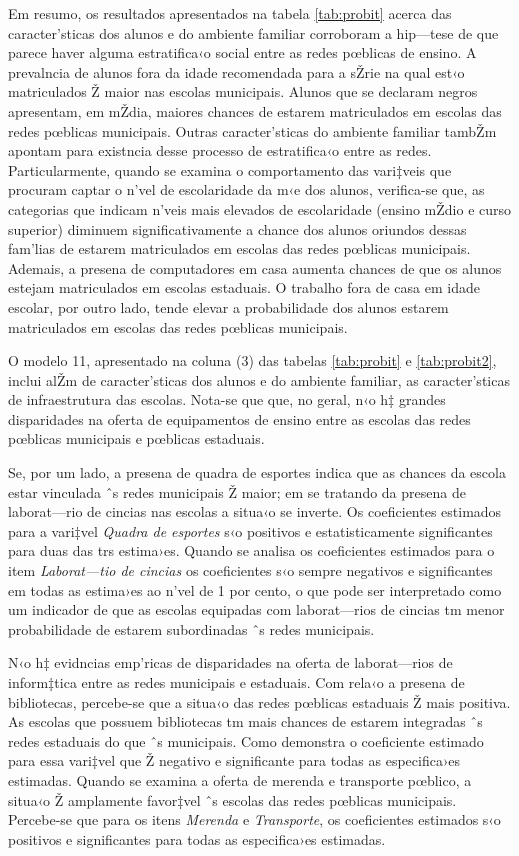 \documentclass[a4paper, 12pt]{article}
\begin{document}
Em resumo, os resultados apresentados na tabela \ref{tab:probit} acerca das caracter’sticas dos alunos e do ambiente familiar corroboram a hip—tese de que parece haver alguma estratifica‹o social entre as redes pœblicas de ensino. A prevalncia de alunos fora da idade recomendada para a sŽrie na qual est‹o matriculados Ž maior nas escolas municipais. Alunos que se declaram negros apresentam, em mŽdia, maiores chances de estarem matriculados em escolas das redes pœblicas municipais. Outras caracter’sticas do ambiente familiar tambŽm apontam para existncia desse processo de estratifica‹o entre as redes. Particularmente, quando se examina o comportamento das vari‡veis que procuram captar o n’vel de escolaridade da m‹e dos alunos, verifica-se que, as categorias que indicam n’veis mais elevados de escolaridade (ensino mŽdio e curso superior) diminuem significativamente a chance dos alunos oriundos dessas fam’lias de estarem matriculados em escolas das redes pœblicas municipais. Ademais, a presena de computadores em casa aumenta chances de que os alunos estejam matriculados em escolas estaduais. O trabalho fora de casa em idade escolar, por outro lado, tende elevar a probabilidade dos alunos estarem matriculados em escolas das redes pœblicas municipais.

O modelo 11, apresentado na coluna (3) das tabelas \ref{tab:probit} e \ref{tab:probit2}, inclui alŽm de caracter’sticas dos alunos e do ambiente familiar, as caracter’sticas de infraestrutura das escolas. Nota-se que que, no geral, n‹o h‡ grandes disparidades na oferta de equipamentos de ensino entre as escolas das redes pœblicas municipais e pœblicas estaduais.

Se, por um lado, a presena de quadra de esportes indica que as chances da escola estar vinculada ˆs redes municipais Ž maior; em se tratando da presena de laborat—rio de cincias nas escolas a situa‹o se inverte. Os coeficientes estimados para a vari‡vel \emph{Quadra de esportes} s‹o positivos e estatisticamente significantes para duas das trs estima›es. Quando se analisa os coeficientes estimados para o item \emph{Laborat—tio de cincias} os coeficientes s‹o sempre negativos e significantes em todas as estima›es ao n’vel de 1 por cento, o que pode ser interpretado como um indicador de que as escolas equipadas com laborat—rios de cincias tm menor probabilidade de estarem subordinadas ˆs redes municipais.

N‹o h‡ evidncias emp’ricas de disparidades na oferta de laborat—rios de inform‡tica entre as redes municipais e estaduais. Com rela‹o a presena de bibliotecas, percebe-se que a situa‹o das redes pœblicas estaduais Ž mais positiva. As escolas que possuem bibliotecas tm mais chances de estarem integradas ˆs redes estaduais do que ˆs municipais. Como demonstra o coeficiente estimado para essa vari‡vel que Ž negativo e significante para todas as especifica›es estimadas. Quando se examina a oferta de merenda e transporte pœblico, a situa‹o Ž amplamente favor‡vel ˆs escolas das redes pœblicas municipais. Percebe-se que para os itens \emph{Merenda} e \emph{Transporte}, os coeficientes estimados s‹o positivos e significantes para todas as especifica›es estimadas.
\end{document}
